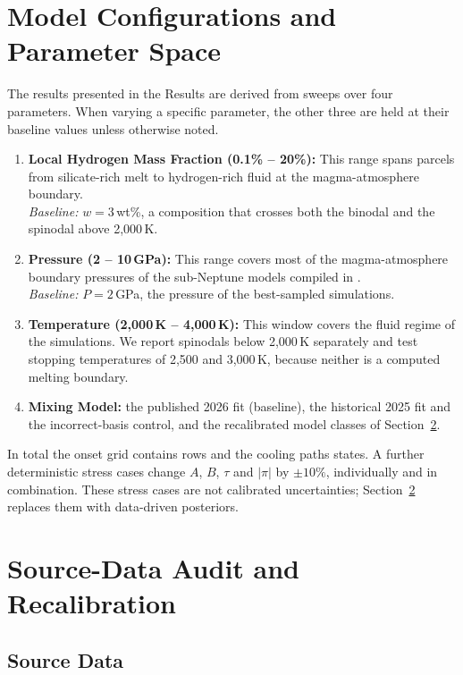 \section{Model Configurations and Parameter Space}

The results presented in the Results are derived from sweeps over four parameters. When
varying a specific parameter, the other three are held at their baseline values unless
otherwise noted.
\begin{enumerate}
\item \textbf{Local Hydrogen Mass Fraction (0.1\% -- 20\%):} This range spans parcels from
silicate-rich melt to hydrogen-rich fluid at the magma-atmosphere boundary.\\
\textit{Baseline:} $w = 3$\,wt\%, a composition that crosses both the binodal and the
spinodal above 2,000\,K.
\item \textbf{Pressure (2 -- 10\,GPa):} This range covers most of the magma-atmosphere
boundary pressures of the sub-Neptune models compiled in \cite{gilmore2026}.\\
\textit{Baseline:} $P = 2$\,GPa, the pressure of the best-sampled simulations.
\item \textbf{Temperature (2,000\,K -- 4,000\,K):} This window covers the fluid regime of the
simulations. We report spinodals below 2,000\,K separately and test stopping temperatures of
2,500 and 3,000\,K, because neither is a computed melting boundary.
\item \textbf{Mixing Model:} the published 2026 fit (baseline), the historical 2025 fit and
the incorrect-basis control, and the recalibrated model classes of
Section~\ref{sec:recalibration}.
\end{enumerate}
In total the onset grid contains \nOnsetRows{} rows and the cooling paths \nCoolingRows{}
states. A further \nStressRows{} deterministic stress cases change $A$, $B$, $\tau$ and
$|\pi|$ by $\pm10\%$, individually and in combination. These stress cases are not calibrated
uncertainties; Section~\ref{sec:recalibration} replaces them with data-driven posteriors.

\section{Source-Data Audit and Recalibration}\label{sec:recalibration}

\subsection{Source Data}

